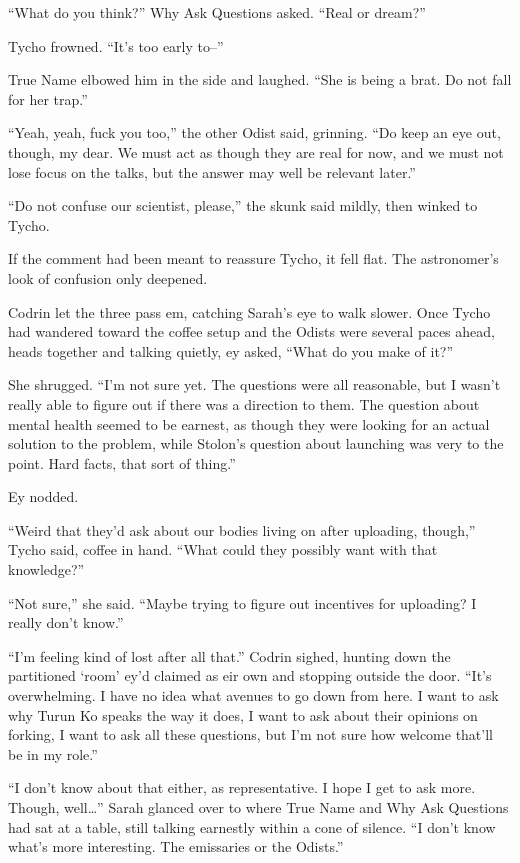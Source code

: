 ``What do you think?'' Why Ask Questions asked. ``Real or dream?''

Tycho frowned. ``It's too early to--''

True Name elbowed him in the side and laughed. ``She is being a brat. Do not fall for her trap.''

``Yeah, yeah, fuck you too,'' the other Odist said, grinning. ``Do keep an eye out, though, my dear. We must act as though they are real for now, and we must not lose focus on the talks, but the answer may well be relevant later.''

``Do not confuse our scientist, please,'' the skunk said mildly, then winked to Tycho.

If the comment had been meant to reassure Tycho, it fell flat. The astronomer's look of confusion only deepened.

Codrin let the three pass em, catching Sarah's eye to walk slower. Once Tycho had wandered toward the coffee setup and the Odists were several paces ahead, heads together and talking quietly, ey asked, ``What do you make of it?''

She shrugged. ``I'm not sure yet. The questions were all reasonable, but I wasn't really able to figure out if there was a direction to them. The question about mental health seemed to be earnest, as though they were looking for an actual solution to the problem, while Stolon's question about launching was very to the point. Hard facts, that sort of thing.''

Ey nodded.

``Weird that they'd ask about our bodies living on after uploading, though,'' Tycho said, coffee in hand. ``What could they possibly want with that knowledge?''

``Not sure,'' she said. ``Maybe trying to figure out incentives for uploading? I really don't know.''

``I'm feeling kind of lost after all that.'' Codrin sighed, hunting down the partitioned `room' ey'd claimed as eir own and stopping outside the door. ``It's overwhelming. I have no idea what avenues to go down from here. I want to ask why Turun Ko speaks the way it does, I want to ask about their opinions on forking, I want to ask all these questions, but I'm not sure how welcome that'll be in my role.''

``I don't know about that either, as representative. I hope I get to ask more. Though, well\ldots{}'' Sarah glanced over to where True Name and Why Ask Questions had sat at a table, still talking earnestly within a cone of silence. ``I don't know what's more interesting. The emissaries or the Odists.''
